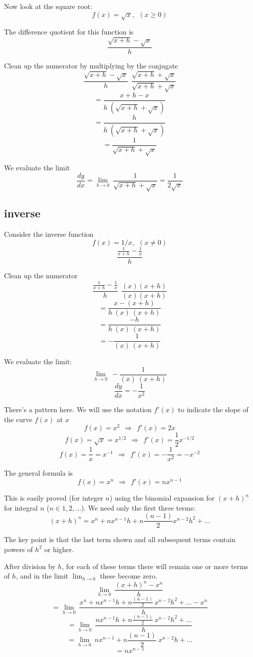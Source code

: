 \documentclass[11pt, oneside]{article}
\begin{document}
Now look at the square root:
\[  f(x)=\sqrt{x}, \ \ (x \ge 0) \]

The difference quotient for this function is
\[   \frac{\sqrt{x+h} - \sqrt{x}}{h} \]

Clean up the numerator by multiplying by the conjugate
\[    \frac{\sqrt{x+h} - \sqrt{x}}{h} \ \  \frac{\sqrt{x+h} + \sqrt{x}}{\sqrt{x+h} + \sqrt{x}} \]
\[    = \frac{x + h - x}{h \ (\sqrt{x+h} + \sqrt{x})} \]
\[    = \frac{h}{h \ (\sqrt{x+h} + \sqrt{x}) } \]
\[    = \frac{1}{\sqrt{x+h} + \sqrt{x}} \]

We evaluate the limit
\[    \frac{dy}{dx} = \lim_{h \to 0} \  \frac{1}{\sqrt{x+h} + \sqrt{x}} = \frac{1}{2\sqrt{x}} \]

\subsection*{inverse}

Consider the inverse function
\[   f(x)=1/x, \ \ (x \ne 0) \]
\[    \frac {  \frac{1}{x+h} - \frac{1}{x}  }  {h} \]

Clean up the numerator
\[    \frac {  \frac{1}{x+h} - \frac{1}{x}  }  {h} \ \  \frac{(x)(x+h)}{(x)(x+h)} \]
\[    = \frac {x - (x+h)}  {h\ (x) \ (x+h)} \]
\[    = \frac {-h}  {h\ (x) \ (x+h)} \]
\[    = -\frac {1}  {(x) \ (x+h)} \]

We evaluate the limit:
\[    \lim_{h \to 0} \  -\frac {1}  {(x) \ (x+h)} \]
\[ \frac{dy}{dx} = - \frac{1}{x^2} \]

There's a pattern here.  We will use the notation $f'(x)$ to indicate the slope of the curve $f(x)$ at $x$
\[       f(x) = x^2 \ \ \Rightarrow \ \  f'(x) = 2x \]
\[       f(x) = \sqrt{x} = x^{1/2}\ \ \Rightarrow \ \  f'(x) = \frac{1}{2}x^{-1/2} \]
\[       f(x) = \frac{1}{x} = x^{-1} \ \ \Rightarrow \ \  f'(x) = -\frac{1}{x^2} = -x^{-2} \]

The general formula is
\[       f(x) = x^n \ \ \Rightarrow \ \  f'(x) = nx^{n-1} \]

This is easily proved (for integer $n$) using the binomial expansion for $(x + h)^n$ for integral $n$ ($n \in 1,2, \dots$).  We need only the first three terms:
\[         (x + h)^n = x^n + n x^{n-1} h + n\frac{(n-1)}{2}x^{n-2} h^2 + \dots  \]

The key point is that the last term shown and all subsequent terms contain powers of $h^2$ or higher.  

After division by $h$, for each of these terms there will remain one or more terms of $h$, and in the limit $\lim_{h \to 0}$ these become zero.
\[            \lim_{h \to 0} \ \frac{(x+h)^n - x^n}{h}  \]
\[            = \lim_{h \to 0} \ \frac{x^n + n x^{n-1} h + n\frac{(n-1)}{2} \ x^{n-2} h^2 + \dots - x^n}{h}  \]
\[            = \lim_{h \to 0} \ \frac{n x^{n-1} h + n\frac{(n-1)}{2}  \ x^{n-2} h^2 + \dots}{h}  \]
\[            = \lim_{h \to 0} \ n x^{n-1} + n\frac{(n-1)}{2}  \ x^{n-2} h + \dots  \]
\[            = n x^{n-1}  \]
\end{document}
